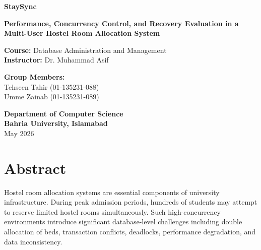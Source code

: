 \documentclass[12pt, a4paper]{report}
\begin{document}
\begin{titlepage}
    \begin{center}
        \vspace*{2cm}
        
        \Huge
        \textbf{StaySync}
        
        \vspace{0.8cm}
        \LARGE
        \textbf{Performance, Concurrency Control, and Recovery Evaluation in a Multi-User Hostel Room Allocation System}
        
        \vspace{2.5cm}
        
        \Large
        \textbf{Course:} Database Administration and Management\\
        \textbf{Instructor:} Dr. Muhammad Asif
        
        \vfill
        
        \Large
        \textbf{Group Members:}\\
        Tehseen Tahir (01-135231-088)\\
        Umme Zainab (01-135231-089)
        
        \vspace{2.5cm}
        
        \Large
        \textbf{Department of Computer Science}\\
        \textbf{Bahria University, Islamabad}\\
        May 2026
        
    \end{center}
\end{titlepage}


\chapter*{Abstract}
Hostel room allocation systems are essential components of university infrastructure. During peak admission periods, hundreds of students may attempt to reserve limited hostel rooms simultaneously. Such high-concurrency environments introduce significant database-level challenges including double allocation of beds, transaction conflicts, deadlocks, performance degradation, and data inconsistency.
\end{document}
